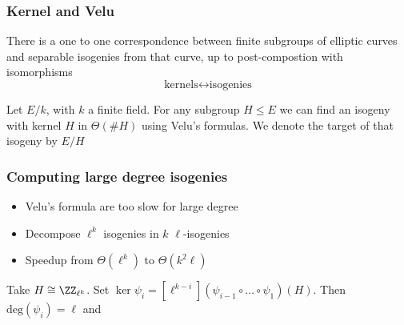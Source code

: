 \documentclass{beamer}
\begin{document}
\begin{frame}
    \frametitle{Kernel and Velu}
    \begin{theorem}
       There is a one to one correspondence between finite subgroups of elliptic curves 
       and separable isogenies from that curve, up to post-compostion with isomorphisms
       \[ \text{kernels} \longleftrightarrow \text{isogenies} \]

    \end{theorem}
       Let $E/k$, with $k$ a finite field. For any subgroup $H \leq E$ we can find an 
       isogeny with kernel $H$ in $\Theta(\#H)$ using Velu's formulas. We denote the target of 
       that isogeny by $E/H$
    
\end{frame}

\begin{frame}
    \frametitle{Computing large degree isogenies}
    \begin{itemize}
        \item Velu's formula are too slow for large degree
        \item Decompose $\ell^k$ isogenies in $k$ $\ell$-isogenies
        \item Speedup from $\Theta(\ell^k)$ to $\Theta(k^2 \ell)$
    \end{itemize}
    Take $H \cong \ZZ_{\ell^k}$. Set $\ker \psi_i = [\ell^{k - i}](\psi_{i-1} \circ \dots \circ \psi_1)(H)$. 
    Then $\mathrm{deg}(\psi_i) = \ell$ and 

    \begin{center}
    \end{center}
    

\end{frame}
\end{document}
